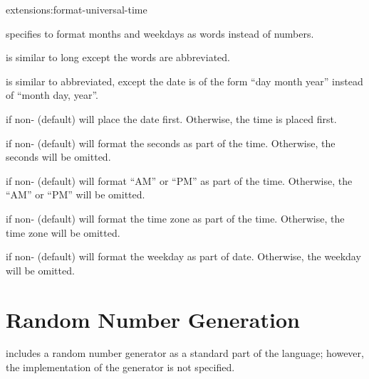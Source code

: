 \begin{defun}{extensions:}{format-universal-time}
\begin{Lentry}
\begin{Lentry}
     \item[\kwd{long}] specifies to format months and weekdays as
       words instead of numbers.
  
     \item[\kwd{abbreviated}] is similar to long except the words are
       abbreviated.
  
     \item[\kwd{government}] is similar to abbreviated, except the
       date is of the form ``day month year'' instead of ``month day,
       year''.
     \end{Lentry}
     
   \item[\kwd{date-first}] if non-\false{} (default) will place the
     date first.  Otherwise, the time is placed first.
  
   \item[\kwd{print-seconds}] if non-\false{} (default) will format
     the seconds as part of the time.  Otherwise, the seconds will be
     omitted.
  
   \item[\kwd{print-meridian}] if non-\false{} (default) will format
     ``AM'' or ``PM'' as part of the time.  Otherwise, the ``AM'' or
     ``PM'' will be omitted.
  
   \item[\kwd{print-timezone}] if non-\false{} (default) will format
     the time zone as part of the time.  Otherwise, the time zone will
     be omitted.

  
   \item[\kwd{print-weekday}] if non-\false{} (default) will format
     the weekday as part of date.  Otherwise, the weekday will be
     omitted.
   \end{Lentry}
\end{defun}


\section{Random Number Generation}

\clisp{} includes a random number generator as a standard part of the
language; however, the implementation of the generator is not
specified.

